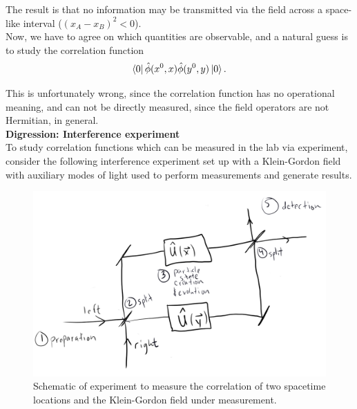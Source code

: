 \noindent The result is that no information may be transmitted via the field across a space-like interval ($(x_A - x_B)^2 < 0$). \\

\noindent Now, we have to agree on which quantities are observable, and a natural guess is to study the correlation function
\begin{equation}
\bra{0} \hat{\phi}(x^0,x) \hat{\phi}(y^0,y) \ket{0}.
\end{equation}

\noindent This is unfortunately wrong, since the correlation function has no operational meaning, and can not be directly measured, since the field operators are not Hermitian, in general. \\

\noindent \textbf{Digression: Interference experiment} \\

\noindent To study correlation functions which can be measured in the lab via experiment, consider the following interference experiment set up with a Klein-Gordon field with auxiliary modes of light used to perform measurements and generate results. \\

\begin{figure}[H]
	\centering
	\includegraphics[scale=0.4]{interference.png}
	\caption{Schematic of experiment to measure the correlation of two spacetime locations and the Klein-Gordon field under measurement.}
\end{figure}

